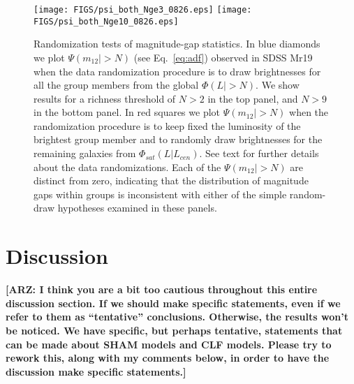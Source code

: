 \documentclass[usenatbib,usegraphicx,letterpaper]{mn2e}
\newcommand{\monetwo}{m_{12}}
\begin{document}
\begin{figure}
\centering
\texttt{[image: FIGS/psi\_both\_Nge3\_0826.eps]}
\texttt{[image: FIGS/psi\_both\_Nge10\_0826.eps]}
\caption{
Randomization tests of magnitude-gap statistics. 
In blue diamonds we plot $\Psi(\monetwo|> N)$ (see Eq.~\ref{eq:adf}) observed in SDSS
Mr19 when the data randomization procedure is to draw brightnesses for
all the group members from the global $\Phi(L|> N).$ We show results
for a richness threshold of $N> 2$ in the top panel, and $N> 9$ in
the bottom panel. In red squares we plot $\Psi(\monetwo|> N)$ when the
randomization procedure is to keep fixed the luminosity of the
brightest group member and to randomly draw brightnesses for the
remaining galaxies from $\Phi_{sat}(L|L_{cen}).$ See text for further
details about the data randomizations. Each of the $\Psi(\monetwo|> N)$ 
are distinct from zero, indicating that the distribution of magnitude gaps 
within groups is inconsistent with either of the simple random-draw 
hypotheses examined in these panels. 
}
\label{fig:psigap}
\end{figure}

\section{Discussion}
\label{section:discussion}

{\bf [ARZ: I think you are a bit too cautious throughout this 
entire discussion section.  If we should make specific statements, 
even if we refer to them as ``tentative'' conclusions.  Otherwise, 
the results won't be noticed.  We have specific, but perhaps tentative, 
statements that can be made about SHAM models and CLF models.  Please 
try to rework this, along with my comments below, in order to have the 
discussion make specific statements.]}
\end{document}
